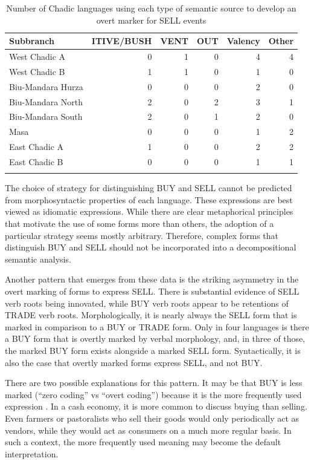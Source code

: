 \begin{table}[H]
	\caption{Number of Chadic languages using each type of semantic source to develop an overt marker for SELL events}
	\label{tab:SELLsemantics}
	\begin{tabular}{lrrrrr} %
		\lsptoprule
		Subbranch	      &  ITIVE/BUSH & VENT & OUT & Valency &  Other \\
		\midrule
West Chadic A	& 0 & 1 & 0 & 4 & 4 \\
West Chadic B	& 1 & 1 & 0 & 1 & 0 \\
Biu-Mandara Hurza & 0 & 0 & 0 & 2 & 0 \\
Biu-Mandara North & 2 & 0 & 2 & 3 & 1 \\
Biu-Mandara South & 2 & 0 & 1 & 2 & 0 \\
Masa			  & 0 & 0 & 0 & 1 & 2 \\
East Chadic A	& 1 & 0 & 0 & 2 & 2 \\
East Chadic B	& 0 & 0 & 0 & 1 & 1 \\
		\lspbottomrule
	\end{tabular}
\end{table}

The choice of strategy for distinguishing BUY and SELL cannot be predicted from morphosyntactic properties of each language. These expressions are best viewed as idiomatic expressions. While there are clear metaphorical principles that motivate the use of some forms more than others, the adoption of a particular strategy seems mostly arbitrary. Therefore, complex forms that distinguish BUY and SELL should not be incorporated into a decompositional semantic analysis.

Another pattern that emerges from these data is the striking asymmetry in the overt marking of forms to express SELL. There is substantial evidence of SELL verb roots being innovated, while BUY verb roots appear to be retentions of TRADE verb roots. Morphologically, it is nearly always the SELL form that is marked in comparison to a BUY or TRADE form. Only in four languages is there a BUY form that is overtly marked by verbal morphology, and, in three of those, the marked BUY form exists alongside a marked SELL form. Syntactically, it is also the case that overtly marked forms express SELL, and not BUY.

There are two possible explanations for this pattern. It may be that BUY is less marked (``zero coding'' vs ``overt coding'') because it is the more frequently used expression \citep[43--44]{haspelmathMarkednessWhatReplace2006}. In a cash economy, it is more common to discuss buying than selling. Even farmers or pastoralists who sell their goods would only periodically act as vendors, while they would act as consumers on a much more regular basis. In such a context, the more frequently used meaning may become the default interpretation. 

